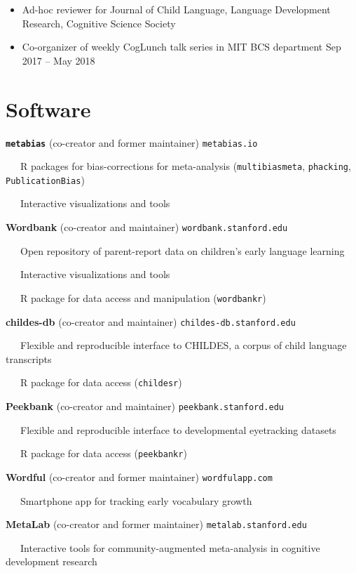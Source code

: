 \documentclass[11pt,]{article}
\providecommand{\tightlist}{%
  \setlength{\itemsep}{0pt}\setlength{\parskip}{0pt}}
\begin{document}
\begin{itemize}
\tightlist
\item
  Ad-hoc reviewer for Journal of Child Language, Language Development
  Research, Cognitive Science Society
\item
  Co-organizer of weekly CogLunch talk series in MIT BCS department
  \hfill Sep 2017 -- May 2018
\end{itemize}

\section{Software}\label{software}

\textbf{\texttt{metabias}} (co-creator and former maintainer)
\hfill \texttt{metabias.io}\\
\strut ~~~R packages for bias-corrections for meta-analysis
(\texttt{multibiasmeta}, \texttt{phacking}, \texttt{PublicationBias})\\
\strut ~~~Interactive visualizations and tools

\textbf{Wordbank} (co-creator and maintainer)
\hfill \texttt{wordbank.stanford.edu}\\
\strut ~~~Open repository of parent-report data on children's early
language learning \\
\strut ~~~Interactive visualizations and tools \\
\strut ~~~R package for data access and manipulation
(\texttt{wordbankr})

\textbf{childes-db} (co-creator and maintainer)
\hfill \texttt{childes-db.stanford.edu}\\
\strut ~~~Flexible and reproducible interface to CHILDES, a corpus of
child language transcripts \\
\strut ~~~R package for data access (\texttt{childesr})

\textbf{Peekbank} (co-creator and maintainer)
\hfill \texttt{peekbank.stanford.edu}\\
\strut ~~~Flexible and reproducible interface to developmental
eyetracking datasets \\
\strut ~~~R package for data access (\texttt{peekbankr})

\textbf{Wordful} (co-creator and former maintainer)
\hfill \texttt{wordfulapp.com}\\
\strut ~~~Smartphone app for tracking early vocabulary growth

\textbf{MetaLab} (co-creator and former maintainer)
\hfill \texttt{metalab.stanford.edu}\\
\strut ~~~Interactive tools for community-augmented meta-analysis in
cognitive development research
\end{document}
